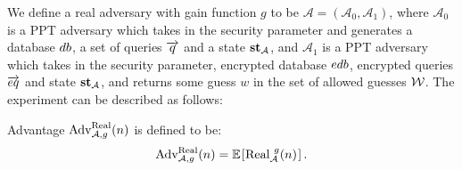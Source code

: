 \begin{definition}
We define a real adversary with gain function $g$ to be $\mathcal{A} = (\mathcal{A}_0, \mathcal{A}_1)$, where $\mathcal{A}_0$ is a PPT adversary which takes in the security parameter and generates a database $db$, a set of queries $\overrightarrow{q}$ and a state $\textbf{st}_{\mathcal{A}}$, and $\mathcal{A}_1$ is a PPT adversary which takes in the security parameter, encrypted database $edb$, encrypted queries $\overrightarrow{eq}$ and state $\textbf{st}_{\mathcal{A}}$, and returns some guess $w$ in the set of allowed guesses $\mathcal{W}$. The experiment can be described as follows:
\begin{pchstack}[center]
\end{pchstack}

Advantage $\text{Adv}_{\mathcal{A},g}^{\text{Real}}(n)$ is defined to be:
\begin{equation}
	\advantage_{\mathcal{A},g}^{\text{Real}}(n) = \expect{\text{Real}_{\adv}^{\ g}(n)}.
\end{equation}
\end{definition}


